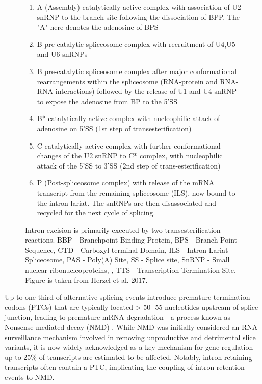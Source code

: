 \begin{figure}[!htp]
{\begin{enumerate}
			\item A (Assembly) catalytically-active complex with association of U2 snRNP to the branch site following the dissociation of BPP. The "A" here denotes the adenosine of BPS
			\item B pre-catalytic spliceosome complex with recruitment of U4,U5 and U6 snRNPs
			\item B pre-catalytic spliceosome complex after major conformational rearrangements within the spliceosome (RNA-protein and RNA-RNA interactions) followed by the release of U1 and U4 snRNP to expose the adenosine from BP to the 5'SS 
			\item B* catalytically-active complex with nucleophilic attack of adenosine on 5'SS (1st step of transesterification) 
			\item C catalytically-active complex with further conformational changes of the U2 snRNP to C* complex, with nucleophilic attack of the 5'SS to 3'SS (2nd step of trans-esterification) 
			\item P (Post-spliceosome complex) with release of the mRNA transcript from the remaining spliceosome (ILS), now bound to the intron lariat. The snRNPs are then disassociated and recycled for the next cycle of splicing.
			\\
		\end{enumerate} 
		Intron excision is primarily executed by two transesterification reactions. BBP - Branchpoint Binding Protein, BPS - Branch Point Sequence, CTD - Carboxyl-terminal Domain, ILS - Intron Lariat Spliceosome, PAS - Poly(A) Site, SS - Splice site, SnRNP - Small nuclear ribonucleoproteins, , TTS - Transcription Termination Site. Figure is taken from Herzel et al. 2017\cite{Herzel2017}.
	}
	\label{fig:AS_mechanism}
\end{figure}

\newpage
{}
Up to one-third of alternative splicing events introduce premature termination codons (PTCs) that are typically located > 50- 55 nucleotides upstream of splice junction, leading to premature mRNA degradation - a process known as Nonsense mediated decay (NMD)\cite{Lewis2003} . While NMD was initially considered an RNA surveillance mechanism involved in removing unproductive and detrimental slice variants, it is now widely acknowledged as a key mechanism for gene regulation\cite{Nickless2017} - up to 25\% of transcripts are estimated to be affected\cite{Weischenfeldt2012}. Notably, intron-retaining transcripts often contain a PTC, implicating the coupling of intron retention events to NMD\cite{Wong2013}.     

